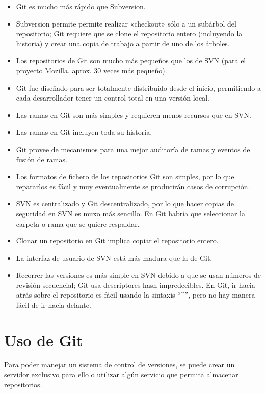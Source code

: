 \begin{itemize}
	\item{
		Git es mucho más rápido que Subversion.
	}	
	\item{
		Subversion permite permite realizar «checkout» sólo a un subárbol del repositorio; Git requiere que se clone el repositorio entero (incluyendo la historia) y crear una copia de trabajo a partir de uno de los árboles.
	}
	\item{
		Los repositorios de Git son mucho más pequeños que los de SVN (para el proyecto Mozilla, aprox. 30 veces más pequeño).
	}
	\item{
		Git fue diseñado para ser totalmente distribuido desde el inicio, permitiendo a cada desarrollador tener un control total en una versión local.
	}
	\item{
		Las ramas en Git son más simples y requieren menos recursos que en SVN.
	}
	\item{
		Las ramas en Git incluyen toda su historia.
	}
	\item{
		Git provee de mecanismos para una mejor auditoría de ramas y eventos de fusión de ramas.
	}
	\item{
		Los formatos de fichero de los repositorios Git son simples, por lo que repararlos es fácil y muy eventualmente se producirán casos de corrupción.
	}
	\item{
		SVN es centralizado y Git descentralizado, por lo que hacer copias de seguridad en SVN es muxo más sencillo. En Git habría que seleccionar la carpeta o rama que se quiere respaldar.
	}
	\item{
		Clonar un repositorio en Git implica copiar el repositorio entero.
	}
	\item{
		La interfaz de usuario de SVN está más madura que la de Git.
	}
	\item{
		Recorrer las versiones es más simple en SVN debido a que se usan números de revisión secuencial; Git usa descriptores hash impredecibles. En Git, ir hacia atrás sobre el repositorio es fácil usando la sintaxis ``\textasciicircum'', pero no hay manera fácil de ir hacia delante.
	}
\end{itemize}

%
%
\section{Uso de Git}
Para poder manejar un sistema de control de versiones, se puede crear un servidor exclusivo para ello o utilizar algún servicio que permita almacenar repositorios.

